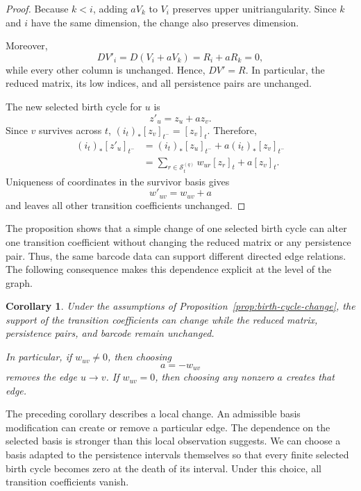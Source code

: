 \documentclass[11pt]{article}
\theoremstyle{paperdefinition}
\theoremstyle{paperplain}
\newtheorem{corollary}[definition]{Corollary}
\theoremstyle{paperremark}
\begin{document}
\begin{proof}
Because $k<i$, adding $aV_k$ to $V_i$ preserves upper unitriangularity. Since $k$ and $i$ have the same dimension, the change also preserves dimension.

Moreover,
\[
DV'_i = D(V_i+aV_k) = R_i+aR_k = 0,
\]
while every other column is unchanged. Hence, $DV'=R$. In particular, the reduced matrix, its low indices, and all persistence pairs are unchanged.

The new selected birth cycle for $u$ is
\[
z'_u=z_u+az_v.
\]
Since $v$ survives across $t$, $(i_t)_*[z_v]_{t^-}=[z_v]_t$. Therefore,
\[
\begin{aligned}
(i_t)_*[z'_u]_{t^-} &= (i_t)_*[z_u]_{t^-} + a(i_t)_*[z_v]_{t^-}\\
&= \sum_{r\in\mathcal S_t^{(q)}}w_{ur}[z_r]_t + a[z_v]_t.
\end{aligned}
\]
Uniqueness of coordinates in the survivor basis gives
\[
w'_{uv}=w_{uv}+a
\]
and leaves all other transition coefficients unchanged.
\end{proof}

The proposition shows that a simple change of one selected birth cycle can alter one transition coefficient without changing the reduced matrix or any persistence pair. Thus, the same barcode data can support different directed edge relations. The following consequence makes this dependence explicit at the level of the graph.

\begin{corollary}
\label{cor:edge-reduction-dependence}
Under the assumptions of Proposition~\ref{prop:birth-cycle-change}, the support of the transition coefficients can change while the reduced matrix, persistence pairs, and barcode remain unchanged.

In particular, if $w_{uv}\neq0$, then choosing
\[
a=-w_{uv}
\]
removes the edge $u\longrightarrow v$. If $w_{uv}=0$, then choosing any nonzero $a$ creates that edge.
\end{corollary}

The preceding corollary describes a local change. An admissible basis modification can create or remove a particular edge. The dependence on the selected basis is stronger than this local observation suggests. We can choose a basis adapted to the persistence intervals themselves so that every finite selected birth cycle becomes zero at the death of its interval. Under this choice, all transition coefficients vanish.
\end{document}
